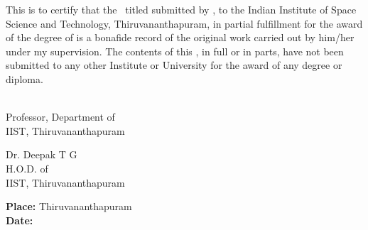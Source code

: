 This is to certify that the \Doctype\ titled \textbf{\textit{\Title}}
submitted by {\bf\Author}, to the Indian Institute of Space Science and
Technology, Thiruvananthapuram, in partial fulfillment for the award of the
degree of {\bf\Degreetext} is a bonafide record of the original work carried
out by him/her under my supervision. The contents of this \Doctype, in full or
in parts, have not been submitted to any other Institute or University for
the award of any degree or diploma.

\vspace{35mm}
\noindent
\begin{minipage}{0.5\textwidth}
\Advisor\\
Professor, Department of {\bf\Department}\\
IIST, Thiruvananthapuram
\end{minipage}
\hspace{2cm}
\begin{minipage}{0.5\textwidth}
Dr. Deepak T G\\
H.O.D.  of {\bf\Department}\\
IIST, Thiruvananthapuram
\end{minipage}

\vspace{30mm}
\noindent
\textbf{Place: }Thiruvananthapuram\\
\textbf{Date: \ }\Date



